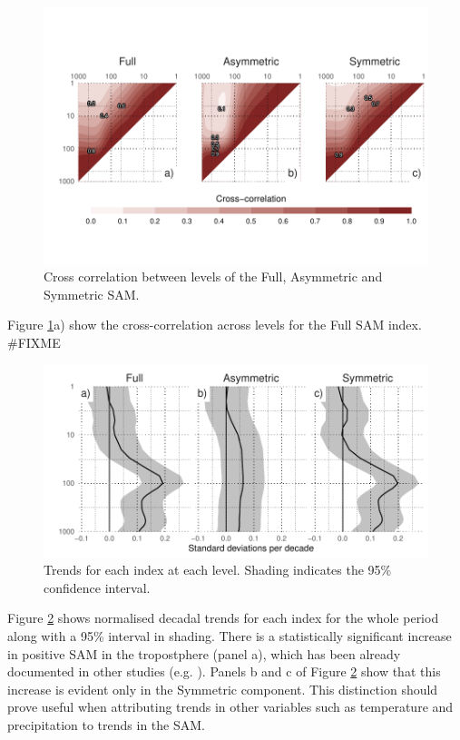 \documentclass[]{ametsocV5}
\begin{document}
\begin{figure}
\includegraphics{cross-correlation-1} \caption[Cross correlation between levels of the Full, Asymmetric and Symmetric SAM]{Cross correlation between levels of the Full, Asymmetric and Symmetric SAM.}\label{fig:cross-correlation}
\end{figure}

Figure \ref{fig:cross-correlation}a) show the cross-correlation across
levels for the Full SAM index. \#FIXME

\begin{figure}
\includegraphics{trends-1} \caption[Trends for each index at each level]{Trends for each index at each level. Shading indicates the 95\% confidence interval.}\label{fig:trends}
\end{figure}

Figure \ref{fig:trends} shows normalised decadal trends for each index
for the whole period along with a 95\% interval in shading. There is a
statistically significant increase in positive SAM in the tropostphere
(panel a), which has been already documented in other studies (e.g.
\citet{fogt2020}). Panels b and c of Figure \ref{fig:trends} show that
this increase is evident only in the Symmetric component. This
distinction should prove useful when attributing trends in other
variables such as temperature and precipitation to trends in the SAM.
\end{document}
